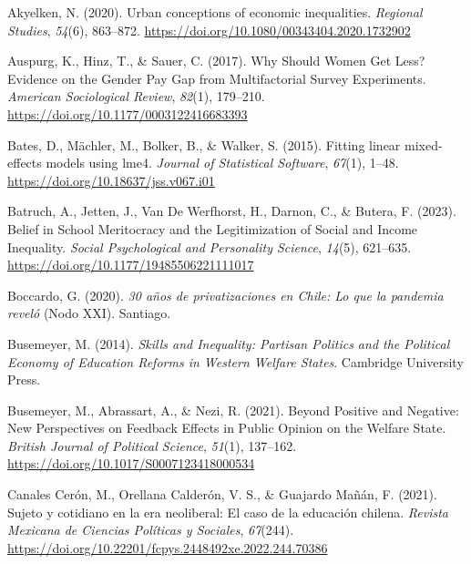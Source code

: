 \documentclass[
  12pt,
]{article}
\newlength{\cslhangindent}
\newenvironment{CSLReferences}[2] %
 {\begin{list}{}{%
  \setlength{\itemindent}{0pt}
  \setlength{\leftmargin}{0pt}
  \setlength{\parsep}{0pt}
  \ifodd #1
   \setlength{\leftmargin}{\cslhangindent}
   \setlength{\itemindent}{-1\cslhangindent}
  \fi
  \setlength{\itemsep}{#2\baselineskip}}}
 {\end{list}}
\begin{document}
\label{refs}
\begin{CSLReferences}{1}{0}
Akyelken, N. (2020). Urban conceptions of economic inequalities.
\emph{Regional Studies}, \emph{54}(6), 863--872.
\url{https://doi.org/10.1080/00343404.2020.1732902}

Auspurg, K., Hinz, T., \& Sauer, C. (2017). Why {Should Women Get Less}?
{Evidence} on the {Gender Pay Gap} from {Multifactorial Survey
Experiments}. \emph{American Sociological Review}, \emph{82}(1),
179--210. \url{https://doi.org/10.1177/0003122416683393}

Bates, D., Mächler, M., Bolker, B., \& Walker, S. (2015). Fitting linear
mixed-effects models using {lme4}. \emph{Journal of Statistical
Software}, \emph{67}(1), 1--48.
\url{https://doi.org/10.18637/jss.v067.i01}

Batruch, A., Jetten, J., Van De Werfhorst, H., Darnon, C., \& Butera, F.
(2023). Belief in {School Meritocracy} and the {Legitimization} of
{Social} and {Income Inequality}. \emph{Social Psychological and
Personality Science}, \emph{14}(5), 621--635.
\url{https://doi.org/10.1177/19485506221111017}

Boccardo, G. (2020). \emph{30 a{ñ}os de privatizaciones en {Chile}: {Lo}
que la pandemia revel{ó}} (Nodo XXI). Santiago.

Busemeyer, M. (2014). \emph{Skills and {Inequality}: {Partisan Politics}
and the {Political Economy} of {Education Reforms} in {Western Welfare
States}}. Cambridge University Press.

Busemeyer, M., Abrassart, A., \& Nezi, R. (2021). Beyond {Positive} and
{Negative}: {New Perspectives} on {Feedback Effects} in {Public Opinion}
on the {Welfare State}. \emph{British Journal of Political Science},
\emph{51}(1), 137--162. \url{https://doi.org/10.1017/S0007123418000534}

Canales Cerón, M., Orellana Calderón, V. S., \& Guajardo Mañán, F.
(2021). Sujeto y cotidiano en la era neoliberal: El caso de la
educaci{ó}n chilena. \emph{Revista Mexicana de Ciencias Pol{í}ticas y
Sociales}, \emph{67}(244).
\url{https://doi.org/10.22201/fcpys.2448492xe.2022.244.70386}


\end{CSLReferences}
\end{document}
